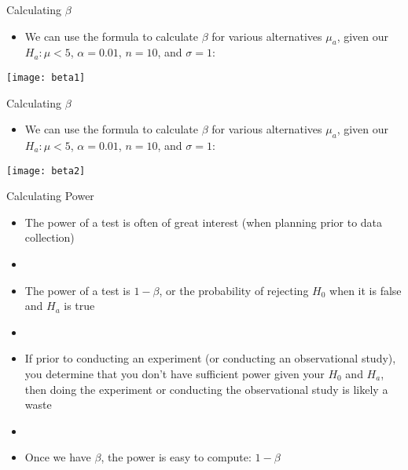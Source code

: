 \documentclass[xcolor=dvipsnames]{beamer}
\begin{document}
\begin{frame}{Calculating $\beta$}
	\begin{itemize}
		\item We can use the formula to calculate $\beta$ for various alternatives $\mu_a$, given our $H_a: \mu < 5$, $\alpha = 0.01$, $n = 10$, and $\sigma = 1$: 
	\end{itemize}
\begin{center}
	\texttt{[image: beta1]}
\end{center}
\end{frame}

\begin{frame}{Calculating $\beta$}
	\begin{itemize}
		\item We can use the formula to calculate $\beta$ for various alternatives $\mu_a$, given our $H_a: \mu < 5$, $\alpha = 0.01$, $n = 10$, and $\sigma = 1$: 
	\end{itemize}
	\begin{center}
		\texttt{[image: beta2]}
	\end{center}
\end{frame}

\begin{frame}{Calculating Power}
	\begin{itemize}
		\item The power of a test is often of great interest (when planning prior to data collection)
		\item[]
		\item The power of a test is $1-\beta$, or the probability of rejecting $H_0$ when it is false and $H_a$ is true
		\item[]
		\item If prior to conducting an experiment (or conducting an observational study), you determine that you don't have sufficient power given your $H_0$ and $H_a$, then doing the experiment or conducting the observational study is likely a waste
		\item[]
		\item Once we have $\beta$, the power is easy to compute: $1-\beta$
	\end{itemize}
\end{frame}
\end{document}
